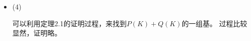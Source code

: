 \documentclass{article}
\begin{document}
\begin{itemize}
        (ii)可以表示$P(k) \cap Q(K)$中的任意列线性函数$f$.

        利用习题28-(2)的结论，排除哪些一定等于$0$的函数值，我们只需定义$f$在$n!$个函数值。

        设$f$在$n!$个矩阵上的值为
        \begin{align*}
          f(A_i) = b_i
        \end{align*}
        令
        \begin{align*}
          g = b_1 f_1 + b_2 f_2 + \cdots + b_{n!} f_{n!}
        \end{align*}
        因为对任意$A_i$，都有
        \begin{align*}
          f(A_i) = g(A_i) = b_i
        \end{align*}
        所以$f = g$。

        综上，$(I)$就是$P(K) \cap Q(K)$的一组基，$P(K) \cap Q(K)$的维数是$n!$.

  \item (4)

        可以利用定理2.1的证明过程，来找到$P(K) + Q(K)$的一组基。
        过程比较显然，证明略。


\end{itemize}
\end{document}
